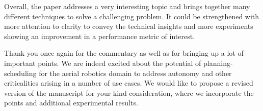 \documentclass[10pt]{letter}
\begin{document}
Overall, the paper addresses a very interesting topic and brings together many different techniques to solve a challenging problem. It could be strengthened with more attention to clarity to convey the technical insights and more experiments showing an improvement in a performance metric of interest.

{\color{blue} 

{\hspace*{-4.5em}{[R2:12]}\vspace*{-1.9em}}

Thank you once again for the commentary as well as for bringing up a lot of important points. We are indeed excited about the potential of planning-scheduling for the aerial robotics domain to address autonomy and other criticalities arising in a number of use cases. We would like to propose a revised version of the manuscript for your kind consideration, where we incorporate the points and additional experimental results.}


\vspace{1em}



\vspace{2em}
\end{document}
